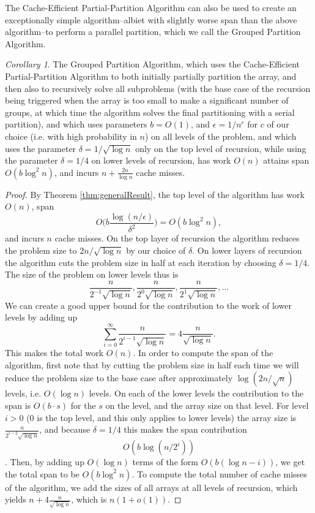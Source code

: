 \documentclass[sigconf]{acmart}
\theoremstyle{remark}
\newtheorem{corollary}[thm]{Corollary}
\theoremstyle{remark}
\begin{document}
The Cache-Efficient Partial-Partition Algorithm can also be used to create an exceptionally simple algorithm--albiet with slightly worse span than the above algorithm--to perform a parallel partition, which we call the Grouped Partition Algorithm.
\begin{corollary}
	The Grouped Partition Algorithm, which uses the Cache-Efficient Partial-Partition Algorithm to both initially partially partition the array, and then also to recursively solve all subproblems (with the base case of the recursion being triggered when the array is too small to make a significant number of groups, at which time the algorithm solves the final partitioning with a serial partition), and which uses parameters $b=O(1)$, and $\epsilon = 1/n^c$ for $c$ of our choice (i.e. with high probability in $n$) on all levels of the problem, and which uses the parameter $\delta=1/\sqrt{\log n}$ only on the top level of recursion, while using the parameter $\delta=1/4$ on lower levels of recursion, has work $O(n)$ attains span $O(b\log^2 n)$, and incurs $n + \frac{2 n}{\log n}$ cache misses. %
\end{corollary}
\begin{proof}
	By Theorem \ref{thm:generalResult}, the top level of the algorithm has work $O(n)$, span $$O\Big(b\frac{\log(n/\epsilon)}{\delta^2}\Big)=O(b\log^2 n),$$ and incurs $n$ cache misses.  
	On the top layer of recursion the algorithm reduces the problem size to $2 n/\sqrt{\log n}$ by our choice of $\delta$.
	On lower layers of recursion the algorithm cuts the problem size in half at each iteration by choosing $\delta = 1/4$.
	The size of the problem on lower levels thus is 
	$$\frac{n}{2^{-1}\sqrt{\log n}}, \frac{n}{2^{0}\sqrt{\log n}}, \frac{n}{2^{1}\sqrt{\log n}}, \ldots$$
	We can create a good upper bound for the contribution to the work of lower levels by adding up $$\sum_{i=0}^{\infty}\frac{n}{2^{i-1}\sqrt{\log n}} = 4\frac{n}{\sqrt{\log n}}.$$
	This makes the total work $O(n)$.
	In order to compute the span of the algorithm, first note that by cutting the problem size in half each time we will reduce the problem size to the base case after approximately $\log (2n/\sqrt{n})$ levels, i.e. $O(\log n)$ levels.
	On each of the lower levels the contribution to the span is $O(b\cdot s)$ for the $s$ on the level, and the array size on that level.
	For level $i>0$ (0 is the top level, and this only applies to lower levels) the array size is $\frac{n}{2^{i-2}\sqrt{\log n}}$, and because $\delta=1/4$ this makes the span contribution $$O(b\log (n/2^i))$$.
	Then, by adding up $O(\log n)$ terms of the form $O(b(\log n - i))$, we get the total span to be $O(b\log^2 n)$.
	To compute the total number of cache misses of the algorithm, we add the sizes of all arrays at all levels of recursion, which yields $n+4\frac{n}{\sqrt{\log n}}$, which is $n(1+o(1))$.
\end{proof}
\end{document}
